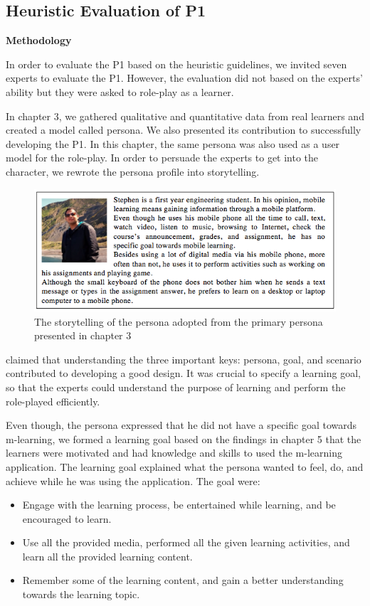 \subsection{Heuristic Evaluation of P1}

\textbf{Methodology}

In order to evaluate the P1 based on the heuristic guidelines, we invited seven experts to evaluate the P1. However, the evaluation did not based on the experts' ability but they were asked to role-play as a learner. 

In chapter 3, we gathered qualitative and quantitative data from real learners and created a model called persona. We also presented its contribution to successfully developing the P1. In this chapter, the same persona was also used as a user model for the role-play. In order to persuade the experts to get into the character, we rewrote the persona profile into storytelling.

\begin{figure}[!hbt]
\centering
\includegraphics[width=1 \textwidth]{heu2}
\caption{The storytelling of the persona adopted from the primary persona presented in chapter 3}
\end{figure}

\cite{cooper2007face} claimed that understanding the three important keys: persona, goal, and scenario contributed to developing a good design. It was crucial to specify a learning goal, so that the experts could understand the purpose of learning and perform the role-played efficiently. 

Even though, the persona expressed that he did not have a specific goal towards m-learning, we formed a learning goal based on the findings in chapter 5 that the learners were motivated and had knowledge and skills to used the m-learning application. The learning goal explained what the persona wanted to feel, do, and achieve while he was using the application. The goal were: 
\begin{itemize}
\item Engage with the learning process, be entertained while learning, and be encouraged to learn. 
\item Use all the provided media, performed all the given learning activities, and learn all the provided learning content. 
\item Remember some of the learning content, and gain a better understanding towards the learning topic. 
\end{itemize} 

